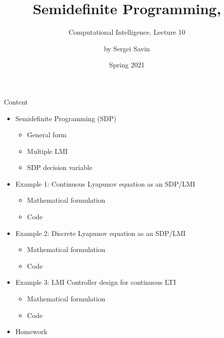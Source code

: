 \documentclass{beamer}
\title{Semidefinite Programming, }
\subtitle{Computational Intelligence, Lecture 10}
\author{by Sergei Savin}
\date{Spring 2021}
\begin{document}
\maketitle


\begin{frame}{Content}

\begin{itemize}
\item  Semidefinite Programming (SDP)
\begin{itemize}
    \item General form
    \item Multiple LMI
    \item SDP decision variable
\end{itemize}
\item  Example 1:  Continuous Lyapunov equation as an SDP/LMI
\begin{itemize}
    \item Mathematical formulation
    \item Code
\end{itemize}
\item  Example 2:  Discrete Lyapunov equation as an SDP/LMI
\begin{itemize}
    \item Mathematical formulation
    \item Code
\end{itemize}
\item  Example 3:  LMI Controller design for continuous LTI
\begin{itemize}
    \item Mathematical formulation
    \item Code
\end{itemize}
\item Homework
\end{itemize}

\end{frame}
\end{document}
